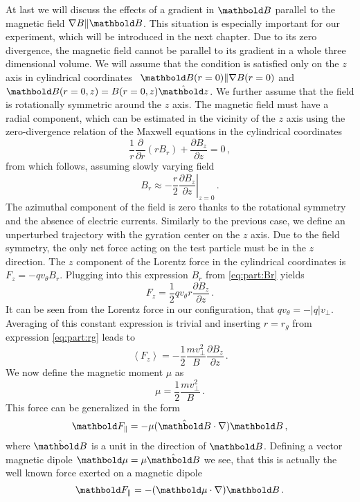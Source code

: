At last we will discuss the effects of a gradient in $\mb B$ parallel to
the magnetic field
\ie $\nabla B\|\mb B$. This situation is especially important for our
experiment, which will be introduced in the next chapter.
Due to its zero divergence, the magnetic field cannot be parallel
to its gradient in a whole three dimensional
volume. We will assume that the condition is satisfied only on
the $z$ axis in cylindrical coordinates \ie\ $\mb B(r=0) \| \nabla B(r=0)$
and $\mb B(r=0, z)= B(r=0,z) \hat{\mb z}$. We further assume that the field is
rotationally symmetric around the $z$ axis.
The magnetic field must have a radial component,
which can be estimated in the vicinity of the $z$ axis using the
zero-divergence relation of the Maxwell equations in the cylindrical coordinates
\begin{equation}
    \frac{1}{r}\frac{\partial}{\partial r}(rB_r) + 
    \frac{\partial B_z}{\partial z} = 0\,,
\end{equation}
from which follows, assuming slowly varying field
\begin{equation}
    B_r\approx-\frac{r}{2}\left.\frac{\partial B_z}{\partial z}\right|_{z=0}\,.
    \label{eq:part:Br}
\end{equation}
The azimuthal component of the field is zero thanks to the rotational symmetry
and the absence of electric currents.
Similarly to the previous case, we define an unperturbed trajectory with
the gyration center on the $z$ axis. Due to the field symmetry, the only
net force acting on the test particle must be in the $z$ direction. The
$z$ component of the Lorentz force in the cylindrical coordinates is 
$F_z = -qv_\theta B_r$. Plugging into this expression $B_r$ from 
\eqref{eq:part:Br} yields
\begin{equation}
    F_z = \frac{1}{2}qv_\theta r\frac{\partial B_z}{\partial z}\,.
\end{equation}
It can be seen from the Lorentz force in our configuration,
that $qv_\theta = -|q|v_\perp$. Averaging of this constant expression
is trivial and inserting $r=r_g$ from expression \eqref{eq:part:rg}
leads to
\begin{equation}
    \left<F_z\right> = -\frac{1}{2}\frac{mv_\perp^2}{B}
    \frac{\partial B_z}{\partial z}\,.
\end{equation}
We now define the magnetic moment $\mu$ as
\begin{equation}
    \mu = \frac{1}{2}\frac{mv_\perp^2}{B}\,.
    \label{eq:part:mu}
\end{equation}
This force can be generalized in the form
\begin{equation}
    \mb F_\|  = -\mu(\hat{\mb B}\cdot\nabla)\mb B\,,
\end{equation}
where $\hat{\mb B}$ is a unit in the direction of $\mb B$. Defining a vector
magnetic dipole $\mb\mu = \mu\hat{\mb B}$ we see, that this is actually
the well known force exerted on a magnetic dipole
\begin{equation}
    \mb F_\|  = -({\mb\mu}\cdot\nabla)\mb B\,.
\end{equation}


